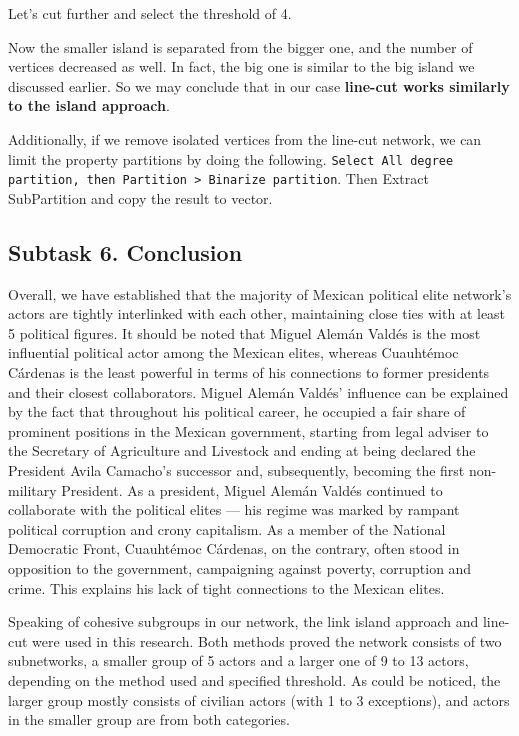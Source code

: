 \FloatBarrier

Let’s cut further and select the threshold of 4.

\FloatBarrier

Now the smaller island is separated from the bigger one, and the number of vertices decreased as well. In fact, the big one is similar to the big island we discussed earlier. So we may conclude that in our case \textbf{line-cut works similarly to the island approach}.

Additionally, if we remove isolated vertices from the line-cut network, we can limit the property partitions by doing the following. \texttt{Select All degree partition, then Partition > Binarize partition}. Then Extract SubPartition and copy the result to vector.


\clearpage


\subsection{Subtask 6. Conclusion}

Overall, we have established that the majority of Mexican political elite network’s actors are tightly interlinked with each other, maintaining close ties with at least 5 political figures. It should be noted that Miguel Alemán Valdés is the most influential political actor among the Mexican elites, whereas Cuauhtémoc Cárdenas is the least powerful in terms of his connections to former presidents and their closest collaborators. Miguel Alemán Valdés’ influence can be explained by the fact that throughout his political career, he occupied a fair share of prominent positions in the Mexican government, starting from legal adviser to the Secretary of Agriculture and Livestock and ending at being declared the President Avila Camacho’s successor and, subsequently, becoming the first non-military President. As a president, Miguel Alemán Valdés continued to collaborate with the political elites — his regime was marked by rampant political corruption and crony capitalism. As a member of the National Democratic Front, Cuauhtémoc Cárdenas, on the contrary, often stood in opposition to the government, campaigning against poverty, corruption and crime. This explains his lack of tight connections to the Mexican elites.

Speaking of cohesive subgroups in our network, the link island approach and line-cut were used in this research. Both methods proved the network consists of two subnetworks, a smaller group of 5 actors and a larger one of 9 to 13 actors, depending on the method used and specified threshold. As could be noticed, the larger group mostly consists of civilian actors (with 1 to 3 exceptions), and actors in the smaller group are from both categories. 


